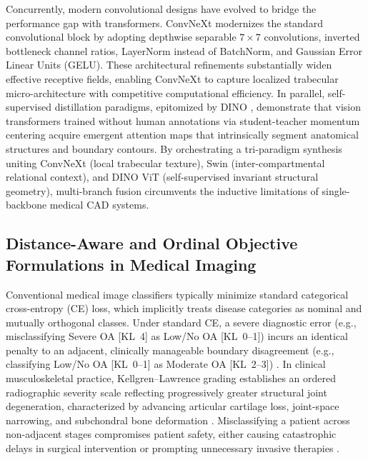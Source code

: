\documentclass[10pt,journal]{IEEEtran}
\begin{document}
Concurrently, modern convolutional designs have evolved to bridge the performance gap with transformers. ConvNeXt \cite{liu2022convnext} modernizes the standard convolutional block by adopting depthwise separable $7 \times 7$ convolutions, inverted bottleneck channel ratios, LayerNorm instead of BatchNorm, and Gaussian Error Linear Units (GELU). These architectural refinements substantially widen effective receptive fields, enabling ConvNeXt to capture localized trabecular micro-architecture with competitive computational efficiency. In parallel, self-supervised distillation paradigms, epitomized by DINO \cite{caron2021dino}, demonstrate that vision transformers trained without human annotations via student-teacher momentum centering acquire emergent attention maps that intrinsically segment anatomical structures and boundary contours. By orchestrating a tri-paradigm synthesis uniting ConvNeXt (local trabecular texture), Swin (inter-compartmental relational context), and DINO ViT (self-supervised invariant structural geometry), multi-branch fusion circumvents the inductive limitations of single-backbone medical CAD systems.

\subsection{Distance-Aware and Ordinal Objective Formulations in Medical Imaging}
\label{subsec:ordinal_formulations}

Conventional medical image classifiers typically minimize standard categorical cross-entropy (CE) loss, which implicitly treats disease categories as nominal and mutually orthogonal classes. Under standard CE, a severe diagnostic error (e.g., misclassifying Severe OA [KL~4] as Low/No OA [KL~0--1]) incurs an identical penalty to an adjacent, clinically manageable boundary disagreement (e.g., classifying Low/No OA [KL~0--1] as Moderate OA [KL~2--3]) \cite{antony2016quantifying}. In clinical musculoskeletal practice, Kellgren--Lawrence grading establishes an ordered radiographic severity scale reflecting progressively greater structural joint degeneration, characterized by advancing articular cartilage loss, joint-space narrowing, and subchondral bone deformation \cite{kellgren1957radiological, emrani2008joint}. Misclassifying a patient across non-adjacent stages compromises patient safety, either causing catastrophic delays in surgical intervention or prompting unnecessary invasive therapies \cite{carr2012knee, zhang2010eular}.
\end{document}
